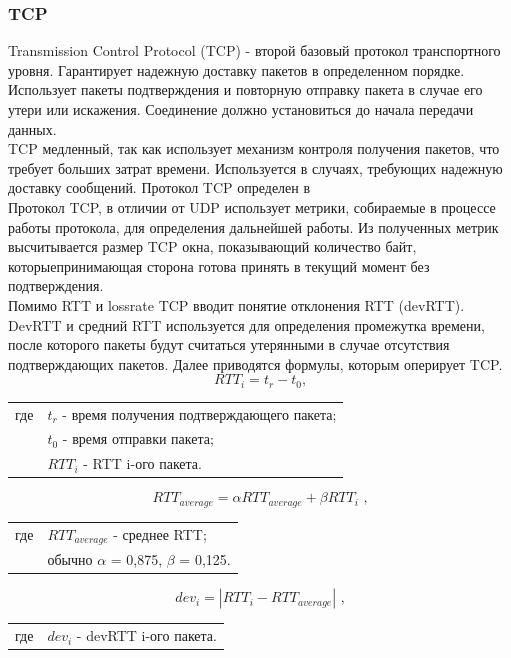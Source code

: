 \documentclass[14pt, a4paper]{extarticle}
\begin{document}
\subsubsection{TCP}
Transmission Control Protocol (TCP) - второй базовый протокол транспортного уровня. Гарантирует надежную доставку пакетов в определенном порядке. Использует пакеты подтверждения и повторную отправку пакета в случае его утери или искажения. Соединение должно установиться до начала передачи данных. \\ 
\indent TCP медленный, так как использует механизм контроля получения пакетов, что требует больших затрат времени. Используется в случаях, требующих надежную доставку сообщений. Протокол TCP определен в  \\
\indent Протокол TCP, в отличии от UDP использует метрики, собираемые в процессе работы протокола, для определения дальнейшей работы. Из полученных метрик высчитывается размер TCP окна, показывающий количество байт, которыепринимающая сторона готова принять в текущий момент без подтверждения. \\ 
\indent Помимо RTT и lossrate TCP вводит понятие отклонения RTT (devRTT). DevRTT и средний RTT используется для определения промежутка времени, после которого пакеты будут считаться утерянными в случае отсутствия подтверждающих пакетов. Далее приводятся формулы, которым оперирует TCP.
\begin{equation}
	RTT_{i} = t_{r} - t_{0} \text{,}
\end{equation}
\begin{tabular}{rl}
	где & $t_{r}$ - время получения подтверждающего пакета; \\
	& $t_{0}$ - время отправки пакета; \\
	& $RTT_{i}$ - RTT i-ого пакета. 
\end{tabular}

\begin{equation}
	RTT_{average}= \alpha RTT_{average} + \beta{RTT_{i}} \text{ ,}
\end{equation}
\begin{tabular}{rl}
	где & $RTT_{average}$ - среднее RTT; \\
	& обычно $\alpha$ = 0,875, $\beta$ = 0,125.
\end{tabular}

\begin{equation}
	dev_{i} = | RTT_{i} - RTT_{average} |\text{ ,}
\end{equation}
\begin{tabular}{rl}
	где & $dev_{i}$ - devRTT i-ого пакета.
\end{tabular}
\end{document}
